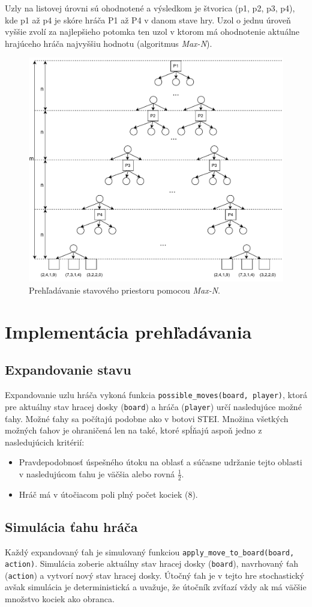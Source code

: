 \documentclass[a4paper, 11pt]{article}
\begin{document}
Uzly na listovej úrovni sú ohodnotené a výsledkom je štvorica (p1, p2, p3, p4), kde p1 až p4 je skóre hráča P1 až P4 v danom stave hry. Uzol o jednu úroveň vyššie zvolí za najlepšieho potomka ten uzol v ktorom má ohodnotenie aktuálne hrajúceho hráča najvyššiu hodnotu (algoritmus \textit{Max-N}).

\begin{figure}[bt]
	\centering
	\includegraphics[width=.6\textwidth]{figures/sui-dfs.pdf}
	\caption{Prehľadávanie stavového priestoru pomocou \textit{Max-N}.}
	\label{img:dfs}
\end{figure}

\section{Implementácia prehľadávania}

\subsection{Expandovanie stavu}
Expandovanie uzlu hráča vykoná funkcia \texttt{possible\_moves(board, player)}, ktorá pre aktuálny stav hracej dosky (\texttt{board}) a hráča (\texttt{player}) určí nasledujúce možné ťahy. Možné ťahy sa počítajú podobne ako v botovi STEI. Množina všetkých možných ťahov je ohraničená len na také, ktoré spĺňajú aspoň jedno z nasledujúcich kritérií:
\begin{itemize}
	\item Pravdepodobnosť úspešného útoku na oblasť a súčasne udržanie tejto oblasti v nasledujúcom ťahu je väčšia alebo rovná $\frac{1}{2}$.
	\item Hráč má v útočiacom poli plný počet kociek (8).
\end{itemize}

\subsection{Simulácia ťahu hráča}
Každý expandovaný ťah je simulovaný funkciou \texttt{apply\_move\_to\_board(board, action)}. Simulácia zoberie aktuálny stav hracej dosky (\texttt{board}), navrhovaný ťah (\texttt{action}) a vytvorí nový stav hracej dosky. Útočný ťah je v tejto hre stochastický avšak simulácia je deterministická a uvažuje, že útočník zvíťazí vždy ak má väčšie množstvo kociek ako obranca.
\end{document}
